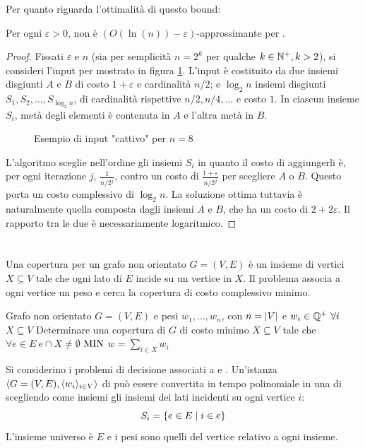 Per quanto riguarda l'ottimalità di questo bound:
\begin{theorem}
	Per ogni $\varepsilon>0$, \GreedySetCover non è $(O(\ln(n))-\varepsilon)$-approssimante per \MinSetCover.
\end{theorem}
\begin{proof}
	Fissati $\varepsilon$ e $n$ (sia per semplicità $n=2^k$ per qualche $k\in\mathbb N^+,k>2$), si consideri l'input per \MinSetCover mostrato in figura \ref{fig:setcover_tightness}.
	L'input è costituito da due insiemi disgiunti $A$ e $B$ di costo $1+\varepsilon$ e cardinalità $n/2$; e $\log_2 n$ insiemi disgiunti $S_1,S_2,\dots,S_{\log_2 n}$, di cardinalità rispettive $n/2,n/4,\dots$ e costo $1$. In ciascun insieme $S_i$, metà degli elementi è contenuta in $A$ e l'altra metà in $B$.

	\begin{figure}[ht]
		\centering
		
		\caption{Esempio di input "cattivo" per $n=8$}
		\label{fig:setcover_tightness}
	\end{figure}

	L'algoritmo sceglie nell'ordine gli insiemi $S_i$ in quanto il costo di aggiungerli è, per ogni iterazione $j$, $\frac{1}{n/2^j}$, contro un costo di $\frac{1+\varepsilon}{n/2^j}$ per scegliere $A$ o $B$.
	Questo porta un costo complessivo di $\log_2 n$. La soluzione ottima tuttavia è naturalmente quella composta dagli insiemi $A$ e $B$, che ha un costo di $2+2\varepsilon$. Il rapporto tra le due è necessariamente logaritmico.
\end{proof}



\section{\VertexCover}
Una copertura per un grafo non orientato $G=(V,E)$ è un insieme di vertici $X\subseteq V$ tale che ogni lato di $E$ incide su un vertice in $X$.
Il problema \VertexCover associa a ogni vertice un peso e cerca la copertura di costo complessivo minimo.

\popt{\VertexCover}
{Grafo non orientato $G=(V,E)$ e pesi $w_1,\dots,w_n$, con $n=| V |$ e $w_i\in\mathbb Q^+~\forall i$}
{$X\subseteq V$}
{Determinare una copertura di $G$ di costo minimo}
{$X\subseteq V$ tale che $\forall e\in E ~ e\cap X\neq\emptyset$}
{$\mathrm{MIN}$}
{$w=\sum_{i\in X} w_i$}

Si considerino i problemi di decisione associati a \VertexCover e \MinSetCover.
Un'istanza $\langle G=(V,E),\langle w_i \rangle_{i\in V} \rangle$ di \VertexCover può essere convertita in tempo polinomiale in una di \MinSetCover scegliendo come insiemi gli insiemi dei lati incidenti su ogni vertice $i$:
\begin{equation*}
	S_i=\left\{ e\in E\mid i\in e \right\}
\end{equation*}
L'insieme universo è $E$ e i pesi sono quelli del vertice relativo a ogni insieme.

